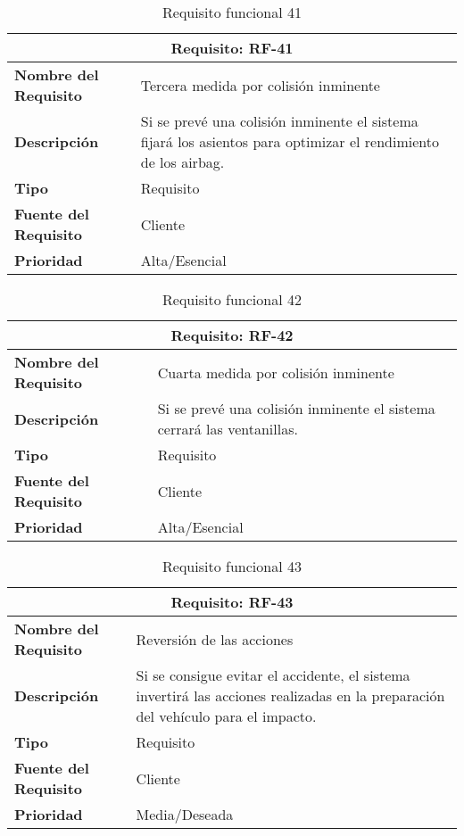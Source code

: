 \begin{table}[H]
\begin{center}
\begin{tabular}{p{} p{7cm}}
\multicolumn{2}{c}{\textbf{Requisito: RF-41} } \\
\hline \hline
\textbf{Nombre del Requisito} & Tercera medida por colisión inminente\\
\hline
\textbf{Descripción} &  Si se prevé una colisión inminente el sistema fijará los asientos para optimizar el rendimiento de los airbag.\\
\hline
\textbf{Tipo} & Requisito  \\
\hline
\textbf{Fuente del Requisito} & Cliente  \\
\hline
\textbf{Prioridad} & Alta/Esencial \\ \hline
\end{tabular}
\caption{Requisito funcional 41}
\label{tab:RF-41}
\end{center}
\end{table}

\begin{table}[H]
\begin{center}
\begin{tabular}{p{} p{7cm}}
\multicolumn{2}{c}{\textbf{Requisito: RF-42} } \\
\hline \hline
\textbf{Nombre del Requisito} & Cuarta medida por colisión inminente\\
\hline
\textbf{Descripción} &  Si se prevé una colisión inminente el sistema cerrará las ventanillas.\\
\hline
\textbf{Tipo} & Requisito  \\
\hline
\textbf{Fuente del Requisito} & Cliente  \\
\hline
\textbf{Prioridad} & Alta/Esencial \\ \hline
\end{tabular}
\caption{Requisito funcional 42}
\label{tab:RF-42}
\end{center}
\end{table}

\begin{table}[H]
\begin{center}
\begin{tabular}{p{} p{7cm}}
\multicolumn{2}{c}{\textbf{Requisito: RF-43} } \\
\hline \hline
\textbf{Nombre del Requisito} & Reversión de las acciones\\
\hline
\textbf{Descripción} &  Si se consigue evitar el accidente, el sistema invertirá las acciones realizadas en la preparación del vehículo para el impacto.\\
\hline
\textbf{Tipo} & Requisito  \\
\hline
\textbf{Fuente del Requisito} & Cliente  \\
\hline
\textbf{Prioridad} & Media/Deseada \\ \hline
\end{tabular}
\caption{Requisito funcional 43}
\label{tab:RF-43}
\end{center}
\end{table}


